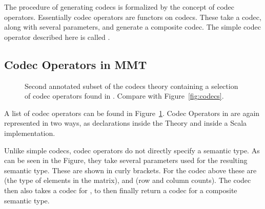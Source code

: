 The procedure of generating codecs is formalized by the concept of codec operators. 
Essentially codec operators are functors on codecs. 
These take a codec, along with several parameters, and generate a composite codec. 
The simple codec operator described here is called . 

\subsection{Codec Operators in MMT}\label{sec:vt:operatormmt}

\begin{figure}[ht]\centering
  \caption[List of Codec Operators]{
    Second annotated subset of the codecs theory containing a selection of codec operators found in \mmt. 
    Compare with Figure~\ref{fig:codecs}. 
  }
  \label{fig:codecops}
\end{figure}
A list of codec operators can be found in Figure~\ref{fig:codecops}. 
Codec Operators in \mmt are again represented in two ways, as declarations inside the  Theory and inside a Scala implementation. 

Unlike simple codecs, codec operators do not directly specify a semantic type. 
As can be seen in the Figure, they take several parameters used for the resulting semantic type. 
These are shown in curly brackets. 
For the  codec above these are  (the type of elements in the matrix),  and  (row and column counts).
The codec then also takes a codec for , to then finally return a codec for a composite semantic type. 

